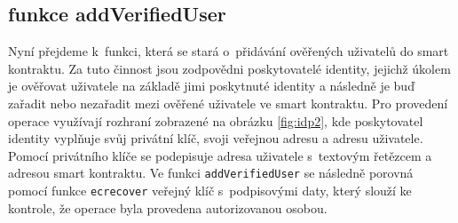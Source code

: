 \subsection{funkce addVerifiedUser}
Nyní přejdeme k~funkci, která se stará o~přidávání ověřených uživatelů do smart kontraktu. Za tuto činnost jsou zodpovědni poskytovatelé identity, jejichž úkolem je ověřovat uživatele na základě jimi poskytnuté identity a následně je buď zařadit nebo nezařadit mezi ověřené uživatele ve smart kontraktu. Pro provedení operace využívají rozhraní zobrazené na obrázku \ref{fig:idp2}, kde poskytovatel identity vyplňuje svůj privátní klíč, svoji veřejnou adresu a adresu uživatele. Pomocí privátního klíče se podepisuje adresa uživatele s~textovým řetězcem a adresou smart kontraktu. Ve funkci \texttt{addVerifiedUser} se následně porovná pomocí funkce \texttt{ecrecover} veřejný klíč s~podpisovými daty, který slouží ke kontrole, že operace byla provedena autorizovanou osobou. 
